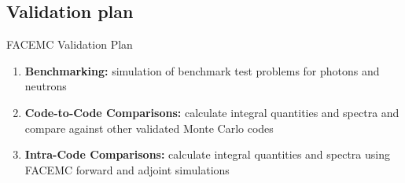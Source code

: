 \documentclass{beamer}
\begin{document}

\subsection{Validation plan}
\begin{frame}{FACEMC Validation Plan}

      \begin{enumerate}
        \item \textbf{Benchmarking:} simulation of benchmark test problems for 
          photons and neutrons
          \bigskip
          \bigskip
        \item \textbf{Code-to-Code Comparisons:} calculate integral quantities 
          and spectra and compare against other validated Monte Carlo codes 
          \bigskip
          \bigskip
        \item \textbf{Intra-Code Comparisons:} calculate integral quantities 
          and spectra using FACEMC forward and adjoint simulations
      \end{enumerate}
    
\end{frame}
\end{document}
